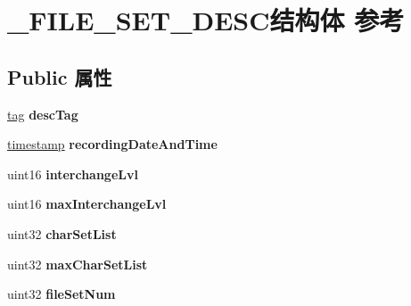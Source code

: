 \hypertarget{struct___f_i_l_e___s_e_t___d_e_s_c}{}\section{\+\_\+\+F\+I\+L\+E\+\_\+\+S\+E\+T\+\_\+\+D\+E\+S\+C结构体 参考}
\label{struct___f_i_l_e___s_e_t___d_e_s_c}
\subsection*{Public 属性}
\begin{DoxyCompactItemize}
\item 
\mbox{\label{struct___f_i_l_e___s_e_t___d_e_s_c_abf2408658d6d31840ce43bf97acab83c}} 
\hyperlink{structtag}{tag} {\bfseries desc\+Tag}
\item 
\mbox{\label{struct___f_i_l_e___s_e_t___d_e_s_c_a912e0ed32fbb56fc0c5805c14ec35b20}} 
\hyperlink{structtimestamp}{timestamp} {\bfseries recording\+Date\+And\+Time}
\item 
\mbox{\label{struct___f_i_l_e___s_e_t___d_e_s_c_a146f3d37462ab1ef30f2c8b161a1eac0}} 
uint16 {\bfseries interchange\+Lvl}
\item 
\mbox{\label{struct___f_i_l_e___s_e_t___d_e_s_c_ab93d3b522fc48e3b084a810e6f9d6091}} 
uint16 {\bfseries max\+Interchange\+Lvl}
\item 
\mbox{\label{struct___f_i_l_e___s_e_t___d_e_s_c_ac724efdcdf7e39278c0594a4b8cbf885}} 
uint32 {\bfseries char\+Set\+List}
\item 
\mbox{\label{struct___f_i_l_e___s_e_t___d_e_s_c_a4c5f0466d2b3f33856d82e740180207f}} 
uint32 {\bfseries max\+Char\+Set\+List}
\item 
\mbox{\label{struct___f_i_l_e___s_e_t___d_e_s_c_a91ad9e5a261f1c8f1a6a4ec100cb122a}} 
uint32 {\bfseries file\+Set\+Num}
\item 
\mbox{\label{struct___f_i_l_e___s_e_t___d_e_s_c_a5bf42810cd13cb6ebebf7e1948791d29}} 

\end{DoxyCompactItemize}
